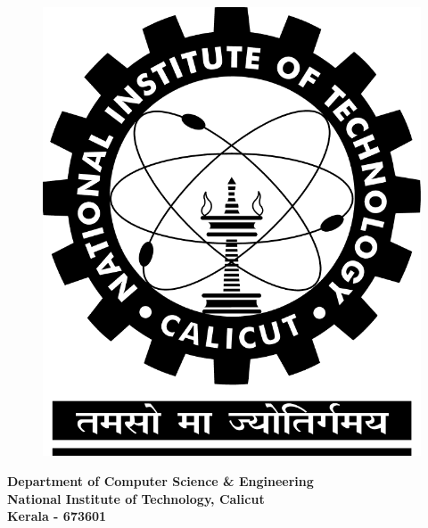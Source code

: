 \begin{center}
\begin{figure}[!ht]
\begin{center}
			\includegraphics[scale=0.10]{nitclogo}\\%
		\end{center}
	\end{figure}
	\large\bf{Department of Computer Science \& Engineering}\\%
	\Large\bf{National Institute of Technology, Calicut}\\%
	\small\bf{Kerala - 673601}\\%
\end{center}%
